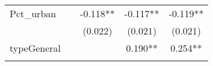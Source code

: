 \documentclass[]{article}
\begin{document}
\begin{longtable}[]{@{}lcccc@{}}
\begin{minipage}[t]{0.26\columnwidth}
Pct\_urban\strut
\end{minipage} & \begin{minipage}[t]{0.12\columnwidth}\centering\strut
\strut
\end{minipage} & \begin{minipage}[t]{0.13\columnwidth}\centering\strut
-0.118**\strut
\end{minipage} & \begin{minipage}[t]{0.14\columnwidth}\centering\strut
-0.117**\strut
\end{minipage} & \begin{minipage}[t]{0.14\columnwidth}\centering\strut
-0.119**\strut
\end{minipage}\tabularnewline
\begin{minipage}[t]{0.26\columnwidth}\raggedright\strut
\strut
\end{minipage} & \begin{minipage}[t]{0.12\columnwidth}\centering\strut
\strut
\end{minipage} & \begin{minipage}[t]{0.13\columnwidth}\centering\strut
(0.022)\strut
\end{minipage} & \begin{minipage}[t]{0.14\columnwidth}\centering\strut
(0.021)\strut
\end{minipage} & \begin{minipage}[t]{0.14\columnwidth}\centering\strut
(0.021)\strut
\end{minipage}\tabularnewline
\begin{minipage}[t]{0.26\columnwidth}\raggedright\strut
typeGeneral\strut
\end{minipage} & \begin{minipage}[t]{0.12\columnwidth}\centering\strut
\strut
\end{minipage} & \begin{minipage}[t]{0.13\columnwidth}\centering\strut
\strut
\end{minipage} & \begin{minipage}[t]{0.14\columnwidth}\centering\strut
0.190**\strut
\end{minipage} & \begin{minipage}[t]{0.14\columnwidth}\centering\strut
0.254**\strut
\end{minipage}\tabularnewline
\begin{minipage}[t]{0.26\columnwidth}\raggedright\strut
\strut
\end{minipage} & \begin{minipage}[t]{0.12\columnwidth}\centering\strut

\end{minipage}
\end{longtable}
\end{document}

